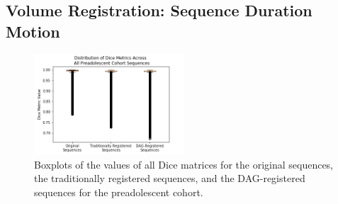 \clearpage

\subsection{Volume Registration: Sequence Duration Motion}

\begin{figure}
\centering
\includegraphics[width=0.5\textwidth]{6/figures/preads-dice-box.png}
\caption{Boxplots of the values of all Dice matrices for the original sequences, the traditionally registered sequences, and the DAG-registered sequences for the preadolescent cohort.}
\label{fig:preads-dice-box}
\end{figure}

